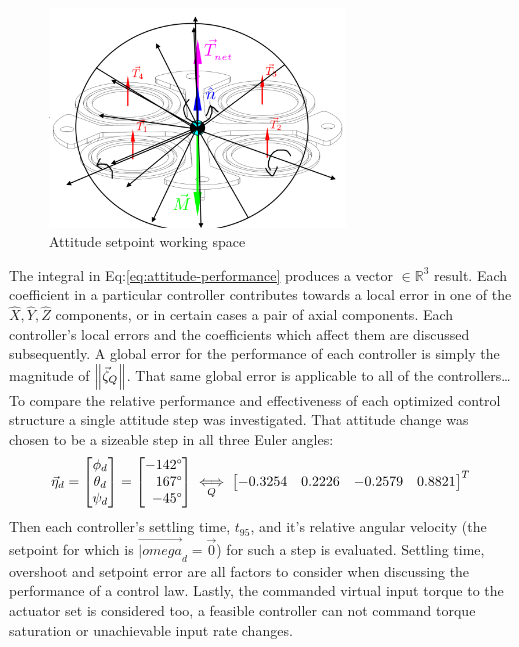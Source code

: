 \begin{figure}[htbp]
\centering
\includegraphics[width=0.7\textwidth]{figs/attitude-setpoint}
\caption{Attitude setpoint working space}
\label{fig:attitude-setpoint}
\end{figure}
\par
The integral in Eq:\ref{eq:attitude-performance} produces a vector $\in\mathbb{R}^{3}$ result. Each coefficient in a particular controller contributes towards a local error in one of the $\hat{X},\hat{Y},\hat{Z}$ components, or in certain cases a pair of axial components. Each controller's local errors and the coefficients which affect them are discussed subsequently. A global error for the performance of each controller is simply the magnitude of $\left\lVert\vec{\zeta}_Q\right\rVert$. That same global error is applicable to all of the controllers\ldots
\newpage
To compare the relative performance and effectiveness of each optimized control structure a single attitude step was investigated. That attitude change was chosen to be a sizeable step in all three Euler angles:
\begin{equation}\label{eq:attitude-step-position}
\vec{\eta}_d=\begin{bmatrix}
\phi_d\\
\theta_d\\
\psi_d\\
\end{bmatrix}
=
\begin{bmatrix*}[r]
-142\text{\textdegree}\\
167\text{\textdegree}\\
-45\text{\textdegree}
\end{bmatrix*}
\underset{Q}{\iff}
\begin{bmatrix}
-0.3254&
0.2226&
-0.2579&
0.8821
\end{bmatrix}^T
\end{equation}
Then each controller's settling time, $t_{95}$, and it's relative angular velocity (the setpoint for which is $\vec{|omega}_d=\vec{0}$) for such a step is evaluated. Settling time, overshoot and setpoint error are all factors to consider when discussing the performance of a control law. Lastly, the commanded virtual input torque to the actuator set is considered too, a feasible controller can not command torque saturation or unachievable input rate changes.
